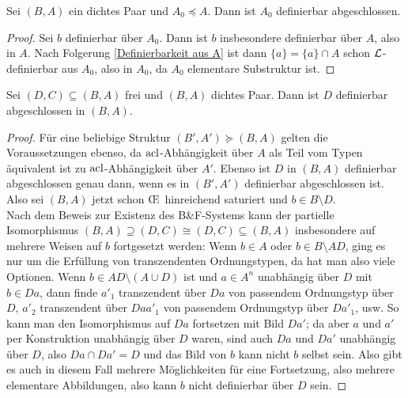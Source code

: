 \begin{corollary}
	Sei $(B,A)$ ein dichtes Paar und $A_0\preceq A$. Dann ist $A_0$ definierbar abgeschlossen.
\end{corollary}
\begin{proof}
	Sei $b$ definierbar über $A_0$. Dann ist $b$ insbesondere definierbar über $A$, also in $A$. Nach Folgerung \ref{Definierbarkeit aus A} ist dann $\{a\}=\{a\}\cap A$ schon $\mathcal{L}$-definierbar aus $A_0$, also in $A_0$, da $A_0$ elementare Substruktur ist.
\end{proof}

\begin{lemma}\label{Freie Definierbarkeit}
	Sei $(D,C)\subseteq(B,A)$ frei und $(B,A)$ dichtes Paar. Dann ist $D$ definierbar abgeschlossen in $(B,A)$.
\end{lemma}
\begin{proof}
	Für eine beliebige Struktur $(B',A')\succeq (B,A)$ gelten die Voraussetzungen ebenso, da $\operatorname{acl}$-Abhängigkeit über $A$ als Teil vom Typen äquivalent ist zu $\operatorname{acl}$-Abhängigkeit über $A'$. Ebenso ist $D$ in $(B,A)$ definierbar abgeschlossen genau dann, wenn es in $(B',A')$ definierbar abgeschlossen ist. Also sei $(B,A)$ jetzt schon \OE\ hinreichend saturiert und $b\in B\setminus D$.\\
	Nach dem Beweis zur Existenz des B\&F-Systems kann der partielle Isomorphismus $(B,A)\supseteq(D,C)\cong(D,C)\subseteq(B,A)$ insbesondere auf mehrere Weisen auf $b$ fortgesetzt werden: Wenn $b\in A$ oder $b\in B\setminus AD$, ging es nur um die Erfüllung von transzendenten Ordnungstypen, da hat man also viele Optionen. Wenn $b\in AD\setminus(A\cup D)$ ist und $a\in A^n$ unabhängig über $D$ mit $b\in Da$, dann finde $a'_1$ transzendent über $Da$ von passendem Ordnungstyp über $D$, $a'_2$ transzendent über $Daa'_1$ von passendem Ordnungstyp über $Da'_1$, usw. So kann man den Isomorphismus auf $Da$ fortsetzen mit Bild $Da'$; da aber $a$ und $a'$ per Konstruktion unabhängig über $D$ waren, sind auch $Da$ und $Da'$ unabhängig über $D$, also $Da\cap Da'=D$ und das Bild von $b$ kann nicht $b$ selbst sein. Also gibt es auch in diesem Fall mehrere Möglichkeiten für eine Fortsetzung, also mehrere elementare Abbildungen, also kann $b$ nicht definierbar über $D$ sein.
\end{proof}

